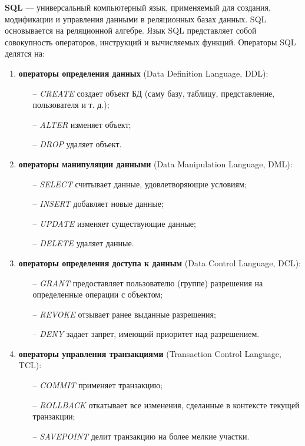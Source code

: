 \textbf{SQL} --- универсальный компьютерный язык, применяемый для создания, модификации и управления данными в реляционных базах данных.
SQL основывается на реляционной алгебре. Язык SQL представляет собой совокупность операторов, инструкций и вычисляемых функций. Операторы SQL делятся на:
\begin{enumerate}
    \item \textbf{операторы определения данных} (Data Definition Language, DDL):
    \begin{itemize}
        \item[--] \textit{CREATE} создает объект БД (саму базу, таблицу, представление, пользователя и т. д.);
        \item[--] \textit{ALTER} изменяет объект;
        \item[--] \textit{DROP} удаляет объект.
    \end{itemize}
    \item \textbf{операторы манипуляции данными} (Data Manipulation Language, DML):
    \begin{itemize}
        \item[--] \textit{SELECT} считывает данные, удовлетворяющие условиям;
        \item[--] \textit{INSERT} добавляет новые данные;
        \item[--] \textit{UPDATE} изменяет существующие данные;
        \item[--] \textit{DELETE} удаляет данные.
    \end{itemize}
    \item \textbf{операторы определения доступа к данным} (Data Control Language, DCL):
    \begin{itemize}
        \item[--] \textit{GRANT} предоставляет пользователю (группе) разрешения на определенные операции с объектом;
        \item[--] \textit{REVOKE} отзывает ранее выданные разрешения;
        \item[--] \textit{DENY} задает запрет, имеющий приоритет над разрешением.
    \end{itemize}
    \item \textbf{операторы управления транзакциями} (Transaction Control Language, TCL):
    \begin{itemize}
        \item[--] \textit{COMMIT} применяет транзакцию;
        \item[--] \textit{ROLLBACK} откатывает все изменения, сделанные в контексте текущей транзакции;
        \item[--] \textit{SAVEPOINT} делит транзакцию на более мелкие участки.
    \end{itemize}
\end{enumerate}

